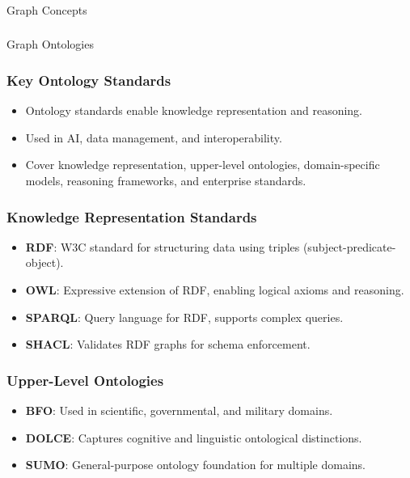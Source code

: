 \begin{frame}[fragile]\frametitle{}
\begin{center}
{\Large Graph Concepts} 
\end{center}
\end{frame}

\begin{frame}[fragile]\frametitle{}
\begin{center}
{\Large Graph Ontologies} 
\end{center}
\end{frame}

\begin{frame}[fragile]\frametitle{Key Ontology Standards}
    \begin{itemize}
        \item Ontology standards enable knowledge representation and reasoning.
        \item Used in AI, data management, and interoperability.
        \item Cover knowledge representation, upper-level ontologies, domain-specific models, reasoning frameworks, and enterprise standards.
    \end{itemize}
\end{frame}

\begin{frame}[fragile]\frametitle{Knowledge Representation Standards}
    \begin{itemize}
        \item \textbf{RDF}: W3C standard for structuring data using triples (subject-predicate-object).
        \item \textbf{OWL}: Expressive extension of RDF, enabling logical axioms and reasoning.
        \item \textbf{SPARQL}: Query language for RDF, supports complex queries.
        \item \textbf{SHACL}: Validates RDF graphs for schema enforcement.
    \end{itemize}
\end{frame}

\begin{frame}[fragile]\frametitle{Upper-Level Ontologies}
    \begin{itemize}
        \item \textbf{BFO}: Used in scientific, governmental, and military domains.
        \item \textbf{DOLCE}: Captures cognitive and linguistic ontological distinctions.
        \item \textbf{SUMO}: General-purpose ontology foundation for multiple domains.
    \end{itemize}
\end{frame}

